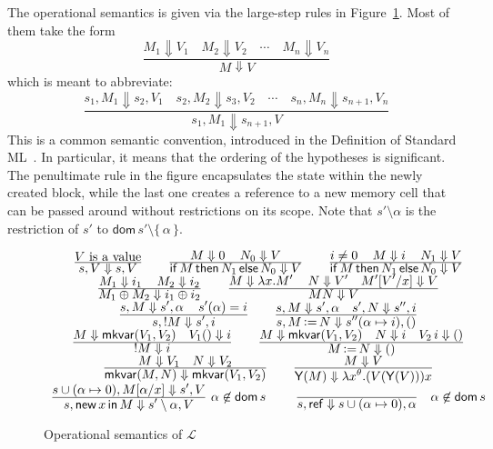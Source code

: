\documentclass{CSML}
\theoremstyle{definition}\newtheorem{definition}[thm]{Definition}
\theoremstyle{definition}\newtheorem{example}[thm]{Example}
\theoremstyle{definition}\newtheorem{proposition}[thm]{Proposition}
\theoremstyle{definition}\newtheorem{lemma}[thm]{Lemma}
\theoremstyle{definition}\newtheorem{theorem}[thm]{Theorem}
\theoremstyle{definition}\newtheorem{corollary}[thm]{Corollary}
\theoremstyle{definition}\newtheorem{remark}[thm]{Remark}
\newcommand\dom[1]{\mathsf{dom}\,#1}
\newcommand\ds{\displaystyle}
\newcommand\badvar[2]{\mathsf{mkvar}(#1,#2)}
\newcommand\fix[1]{\mathsf{Y}(#1)}
\newcommand{\aasg}{\,\raisebox{0.065ex}{:}{=}\,}
\renewcommand\red[2]{#1 \Downarrow #2}
\newcommand\cond[3]{\mathsf{if}\,#1\,\mathsf{then}\,#2\,\mathsf{else}\,#3}
\newcommand\makeset[1]{\{\,#1\,\}}
\newcommand\lang{\mathcal{L}}
\newcommand\new[2]{\mathsf{new}\,#1\,\mathsf{in}\,#2}
\newcommand\newc{\mathsf{ref}}
\newcommand\na\alpha
\begin{document}
The operational semantics is given via the large-step rules in Figure~\ref{fig:opsem}. 
Most of them take the form 
\[
\frac{\ds\red{M_1}{V_1}\quad \red{M_2}{V_2}\quad\cdots\quad \red{M_n}{V_n}}{\ds \red{M}{V}}
\]
which is meant to abbreviate:
\[
\frac{\ds 
\red{s_1,M_1}{s_2,V_1}\quad
\red{s_2,M_2}{s_3,V_2}\quad \cdots\quad \red{s_n,M_n}{s_{n+1}, V_n}}{\ds \red{s_1,M_1}{s_{n+1},V}}
\]
This is a common semantic convention, introduced in the Definition of Standard ML~\cite{MTH90}.
In particular, it means that the ordering of the hypotheses is significant.
The penultimate rule in the figure encapsulates the state within the newly created block,
while the last one creates a reference to a new memory cell that can
be passed around without restrictions on its scope.
Note that $s'\setminus\alpha$
is the restriction of $s'$ to $\dom{s'}\setminus\makeset{\alpha}$.


\begin{figure}[t]
\renewcommand\arraystretch{2.5}
\[\begin{array}{c}
\frac{\ds \textrm{$V$ is a value}}{\ds \red{s,V}{s,V}}\qquad
\frac{\ds \red{M}{0}\quad\, \red{N_0}{V}}{\ds
\red{\cond{M}{N_1}{N_0}}{V}}
\qquad
\frac{\ds i\neq 0\quad\, \red{M}{i}\quad\, \red{N_1}{V}}{\ds
\red{\cond{M}{N_1}{N_0}}{V}}
\\
\frac{\ds \red{M_1}{i_1}\quad\, \red{M_2}{i_2}}{\ds
\red{M_1\oplus M_2}{i_1\oplus i_2}}\qquad
\frac{\ds \red{M}{\lambda x.M'}\quad\,\red{N}{V'}\quad\red{M'[V'/x]}{V}}{\ds
\red{MN}{V}}\\
\frac{\ds \red{s,M}{s',\alpha}\quad\, s'(\alpha)=i}{\ds \red{s,!M}{s',i}}
\qquad
\frac{\ds \red{s,M}{s',\alpha}\quad\red{s',N}{s'',i}} {
\ds\red{s,M\aasg N}{s''(\alpha\mapsto i),()}}\\
\frac{\ds \red{M}{\badvar{V_1}{V_2}}\quad\red{V_1()}{i}}{\ds \red{!M}{i}}
\qquad
\frac{\ds \red{M}{\badvar{V_1}{V_2}}\quad\red{N}{i}\quad \red{V_2\, i}{()}} {
\ds\red{M\aasg N}{()}}\\
\frac{\ds \red{M}{V_1}\quad \red{N}{V_2}}{\ds \red{\badvar{M}{N}}{\badvar{V_1}{V_2}}}
\qquad \frac{\ds\red{M}{V}}{\ds \red{\fix{M}}{\lambda x^\theta. (V(\fix{V}))x} }\\
\frac{\ds\red{s\cup(\alpha\mapsto 0),M[\alpha/x]}{s',V}}{\ds\red{s,\new{x}{M}}{s'\setminus \na, V}}\,\,
\alpha\not\in\dom{s}
\qquad\,\,
\frac{}{\ds\red{s,\newc}{s\cup(\na\mapsto 0), \na}}\quad\alpha\not\in\dom{s}
\end{array}\]
\caption{Operational semantics of $\lang$\label{fig:opsem}}
\makebox[\textwidth][l]{\hrulefill}
\end{figure}
\end{document}
